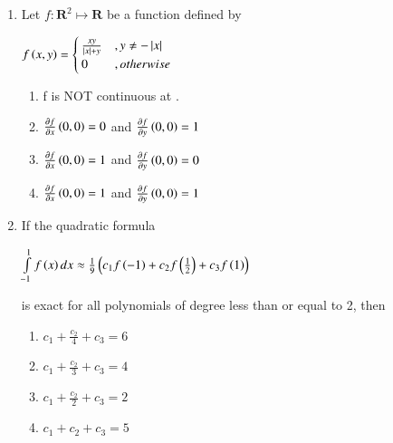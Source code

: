 \documentclass[journal]{IEEEtran}
\begin{document}
\begin{enumerate}[start=1]
\begin{enumerate}
\end{enumerate}
\item %
Let $f: \mathbf{R}^2 \mapsto \mathbf{R}$ be a function defined by 
\begin{center}
    $
    f\left(x,y\right) = 
    \begin{cases}
    \frac{xy}{\left\vert x\right\vert+y} &, y \neq - \left\vert x\right\vert \\
    0 &, otherwise
    \end{cases}
    $
\end{center}
\begin{enumerate} 
\item f is NOT continuous at .
\item  $\frac{\partial{f}}{\partial x}\left(0,0\right) = 0$ and $\frac{\partial{f}}{\partial y}\left(0,0\right) = 1$
\item  $\frac{\partial{f}}{\partial x}\left(0,0\right) = 1$ and $\frac{\partial{f}}{\partial y}\left(0,0\right) = 0$
\item  $\frac{\partial{f}}{\partial x}\left(0,0\right) = 1$ and $\frac{\partial{f}}{\partial y}\left(0,0\right) = 1$
\end{enumerate}
\item %
If the quadratic formula 
\begin{center}
    $\int\limits_{-1}^1 f\left(x\right)dx \approx\frac{1}{9}\left(c_1f\left(-1\right)+c_2f\left(\frac{1}{2}\right)+c_3f\left(1\right)\right)$
\end{center}
is exact for all polynomials of degree less than or equal to 2, then
\begin{enumerate} 
\item $c_1+\frac{c_2}{4}+c_3=6$
\item $c_1+\frac{c_2}{3}+c_3=4$ 
\item $c_1+\frac{c_2}{2}+c_3=2$
\item $c_1+c_2+c_3=5$
\end{enumerate}
\end{enumerate}
\end{document}
